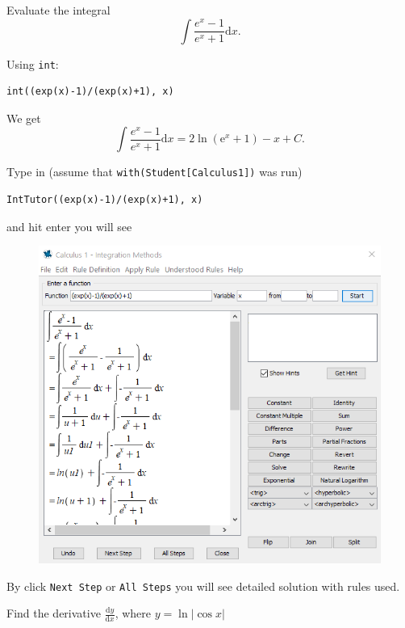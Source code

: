 \documentclass[]{book}
\theoremstyle{definition}
\theoremstyle{definition}
\theoremstyle{definition}
\theoremstyle{remark}
\let\BeginKnitrBlock\begin \let\EndKnitrBlock\end
\begin{document}
\BeginKnitrBlock{example}
\protect\hypertarget{exm:unnamed-chunk-8}{}{\label{exm:unnamed-chunk-8}
}Evaluate the integral \[
\int\dfrac{e^x-1}{e^x+1}\mathrm{d} x.
\]
\EndKnitrBlock{example}

\BeginKnitrBlock{solution}
{} Using \texttt{int}:

\begin{verbatim}
int((exp(x)-1)/(exp(x)+1), x)
\end{verbatim}

We get \[
\int\dfrac{e^x-1}{e^x+1}\mathrm{d} x=2 \ln \left(\mathrm{e}^{x}+1\right)- x+C.
\]

Type in (assume that \texttt{with(Student{[}Calculus1{]})} was run)

\begin{verbatim}
IntTutor((exp(x)-1)/(exp(x)+1), x)
\end{verbatim}

and hit enter you will see

\begin{figure}
\centering
\includegraphics{figs/IntTutor-ex.png}
\caption{}
\end{figure}

By click \texttt{Next\ Step} or \texttt{All\ Steps} you will see
detailed solution with rules used.
\EndKnitrBlock{solution}

\BeginKnitrBlock{exercise}
\protect\hypertarget{exr:unnamed-chunk-10}{}{\label{exr:unnamed-chunk-10} }
Find the derivative \(\frac{\mathrm{d} y}{\mathrm{d} x}\), where
\(y=\ln|\cos x|\)
\EndKnitrBlock{exercise}
\end{document}
